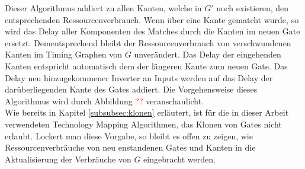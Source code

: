 \documentclass[11pt, a4paper, german]{article}
\newcommand{\TM}{Technology  Mapping }
\begin{document}
Dieser Algorithmus addiert zu allen Kanten, welche in $G'$  noch existieren, den entsprechenden Ressourcenverbrauch. Wenn über eine Kante gematcht wurde, so wird das Delay aller Komponenten des Matches durch die Kanten im neuen Gate ersetzt. Dementsprechend bleibt der Ressourcenverbrauch von verschwundenen Kanten im Timing Graphen von $G$ unverändert.  Das Delay der eingehenden Kanten entspricht automatisch dem der längeren Kante zum neuen Gate. Das Delay neu hinzugekommener Inverter an Inputs werden auf das Delay der darüberliegenden Kante des Gates addiert. Die Vorgehensweise dieses Algorithmus wird durch Abbildung \textcolor{red}{??} veranschaulicht. \\
Wie bereits in Kapitel \ref{subsubsec:klonen} erläutert, ist für die in dieser Arbeit verwendeten \TM Algorithmen, das Klonen von Gates nicht erlaubt. Lockert man diese Vorgabe, so bleibt es offen zu zeigen, wie Ressourcenverbräuche von neu enstandenen Gates und Kanten in die Aktualisierung der Verbräuche von $G$ eingebracht werden. \\

\end{document}
